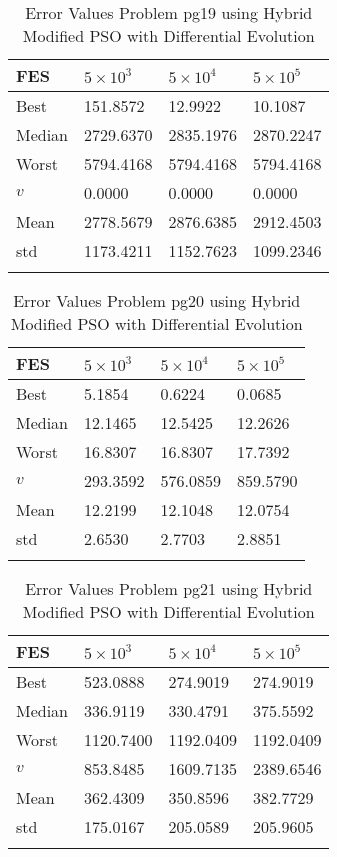 \documentclass[10pt, a4paper]{book}
\begin{document}
\begin{center}
\begin{longtable}{l l l l}
FES & $5 \times 10^{3}$ & $5 \times 10^{4}$ & $5 \times 10^{5}$ \\
\hline
Best & 151.8572 & 12.9922 & 10.1087 \\
Median & 2729.6370 & 2835.1976 & 2870.2247 \\
Worst & 5794.4168 & 5794.4168 & 5794.4168 \\
$v$ & 0.0000 & 0.0000 & 0.0000 \\
Mean & 2778.5679 & 2876.6385 & 2912.4503 \\
std & 1173.4211 & 1152.7623 & 1099.2346 \\
\caption{ Error Values Problem pg19 using Hybrid Modified PSO with Differential Evolution }
\end{longtable}
\end{center}

\begin{center}
\begin{longtable}{l l l l}
FES & $5 \times 10^{3}$ & $5 \times 10^{4}$ & $5 \times 10^{5}$ \\
\hline
Best & 5.1854 & 0.6224 & 0.0685 \\
Median & 12.1465 & 12.5425 & 12.2626 \\
Worst & 16.8307 & 16.8307 & 17.7392 \\
$v$ & 293.3592 & 576.0859 & 859.5790 \\
Mean & 12.2199 & 12.1048 & 12.0754 \\
std & 2.6530 & 2.7703 & 2.8851 \\
\caption{ Error Values Problem pg20 using Hybrid Modified PSO with Differential Evolution }
\end{longtable}
\end{center}

\begin{center}
\begin{longtable}{l l l l}
FES & $5 \times 10^{3}$ & $5 \times 10^{4}$ & $5 \times 10^{5}$ \\
\hline
Best & 523.0888 & 274.9019 & 274.9019 \\
Median & 336.9119 & 330.4791 & 375.5592 \\
Worst & 1120.7400 & 1192.0409 & 1192.0409 \\
$v$ & 853.8485 & 1609.7135 & 2389.6546 \\
Mean & 362.4309 & 350.8596 & 382.7729 \\
std & 175.0167 & 205.0589 & 205.9605 \\
\caption{ Error Values Problem pg21 using Hybrid Modified PSO with Differential Evolution }
\end{longtable}
\end{center}
\end{document}
